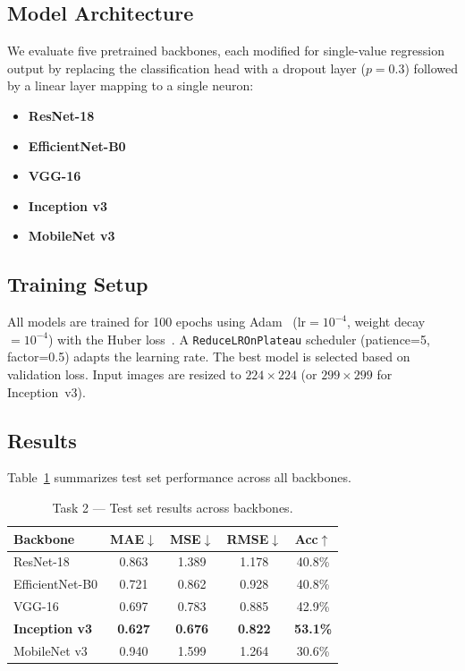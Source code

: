 \documentclass[conference, 10pt]{IEEEtran}
\begin{document}
\subsection{Model Architecture}

We evaluate five pretrained backbones, each modified for single-value regression output by replacing the classification head with a dropout layer ($p=0.3$) followed by a linear layer mapping to a single neuron:

\begin{itemize}
  \item \textbf{ResNet-18}~\cite{he2016resnet}
  \item \textbf{EfficientNet-B0}~\cite{tan2019efficientnet}
  \item \textbf{VGG-16}~\cite{simonyan2015vgg}
  \item \textbf{Inception v3}~\cite{szegedy2016inception}
  \item \textbf{MobileNet v3}~\cite{howard2019mobilenet}
\end{itemize}

\subsection{Training Setup}

All models are trained for 100 epochs using Adam~\cite{kingma2015adam} ($\text{lr}=10^{-4}$, weight decay~$=10^{-4}$) with the Huber loss~\cite{huber1964robust}.
A \texttt{ReduceLROnPlateau} scheduler (patience=5, factor=0.5) adapts the learning rate.
The best model is selected based on validation loss.
Input images are resized to $224 \times 224$ (or $299 \times 299$ for Inception~v3).

\subsection{Results}
Table~\ref{tab:task2_results} summarizes test set performance across all backbones.

\begin{table}[h]
\centering
\caption{Task 2 — Test set results across backbones.}
\label{tab:task2_results}
\begin{tabular}{lcccc}
\toprule
\textbf{Backbone} & \textbf{MAE}$\downarrow$ & \textbf{MSE}$\downarrow$ & \textbf{RMSE}$\downarrow$ & \textbf{Acc}$\uparrow$ \\
\midrule
ResNet-18             & 0.863 & 1.389 & 1.178 & 40.8\% \\
EfficientNet-B0       & 0.721 & 0.862 & 0.928 & 40.8\% \\
VGG-16                & 0.697 & 0.783 & 0.885 & 42.9\% \\
\textbf{Inception v3} & \textbf{0.627} & \textbf{0.676} & \textbf{0.822} & \textbf{53.1\%} \\
MobileNet v3          & 0.940 & 1.599 & 1.264 & 30.6\% \\
\bottomrule
\end{tabular}
\end{table}
\end{document}
